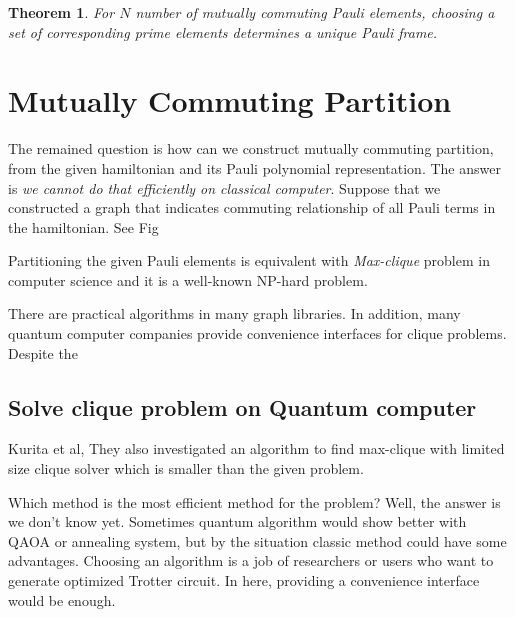 \documentclass[a4paper,12pt]{article}
\newtheorem{theorem}{Theorem}
\begin{document}
\begin{theorem}
    For $N$ number of mutually commuting Pauli elements, choosing a set of corresponding prime elements
    determines a unique Pauli frame. 
\end{theorem}

\section{Mutually Commuting Partition}

The remained question is how can we construct mutually commuting partition, 
from the given hamiltonian and its Pauli polynomial representation.
The answer is \textit{we cannot do that efficiently on classical computer}.
Suppose that we constructed a graph that indicates commuting relationship
of all Pauli terms in the hamiltonian. See Fig %

Partitioning the given Pauli elements is equivalent with \textit{Max-clique}
problem in computer science and it is a well-known NP-hard problem\cite{karp_reducibility_1972}.

There are practical algorithms in many graph libraries.%
 In addition, many quantum computer companies provide convenience interfaces for clique problems. 
Despite the

\subsection{Solve clique problem on Quantum computer}

Kurita et al, 
They also investigated an algorithm to find max-clique with limited size clique solver
which is smaller than the given problem.

Which method is the most efficient method for the problem? 
Well, the answer is we don't know yet. 
Sometimes quantum algorithm would show better with QAOA or annealing system,
but by the situation classic method could have some advantages.
Choosing an algorithm is a job of researchers or users who want to generate optimized 
Trotter circuit. In here, providing a convenience interface would be enough.

%
\end{document}
